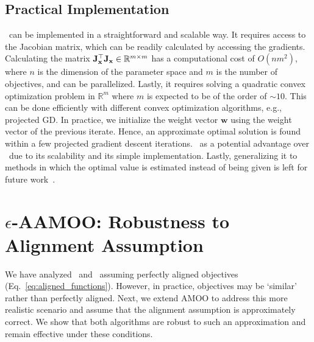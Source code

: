 \subsection{Practical Implementation}


\PAMOO\ can be implemented in a straightforward and scalable way. It requires access to the Jacobian matrix, which can be readily calculated by accessing the gradients.  Calculating the matrix $\mathbf{J}_{{\mathbf{x}}}^\top \mathbf{J}_{{\mathbf{x}}} \in \mathbb{R}^{m\times m}$ 
has a computational cost of $O(nm^2)$, where $n$ is the dimension of the parameter space and $m$ is the number of objectives, and can be parallelized. Lastly, it requires solving a quadratic convex optimization problem in $\mathbb{R}^m$ where $m$ is expected to be of the order of $\sim 10$. This can be done efficiently with different convex optimization algorithms, e.g., projected GD. In practice, we initialize the weight vector $\mathbf{w}$ using the weight vector of the previous iterate. Hence, an approximate optimal solution is found within a few projected gradient descent iterations. \PAMOO\ as a potential advantage over \CAMOO\ due to its scalability and its simple implementation. Lastly, generalizing it to methods in which the optimal value is estimated instead of being given is left for future work~\citep{orvieto2022dynamics,gower2021stochastic}.

\section{$\epsilon$-AAMOO: Robustness to Alignment Assumption}\label{sec:robustness result}


We have analyzed \CAMOO\ and \PAMOO\ assuming perfectly aligned objectives (Eq.~\eqref{eq:aligned_functions}). However, in practice, objectives may be `similar' rather than perfectly aligned. Next, we extend AMOO to address this more realistic scenario and assume that the alignment assumption is approximately correct. We show that both algorithms are robust to such an approximation and remain effective under these conditions.

